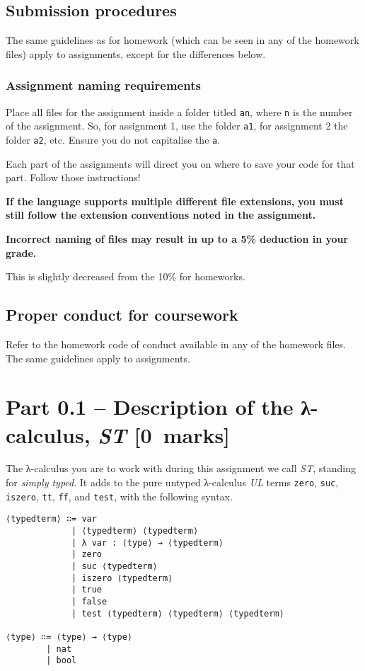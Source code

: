 \documentclass[11pt]{article}
\theoremstyle{definition}
\begin{document}
\subsection*{Submission procedures}
\label{sec:orgdbb70ad}
The same guidelines as for homework
(which can be seen in any of the homework files)
apply to assignments, except for the differences below.

\subsubsection*{Assignment naming requirements}
\label{sec:org925f989}

Place all files for the assignment
inside a folder titled \texttt{an}, where \texttt{n} is the number of the assignment.
So, for assignment 1, use the folder \texttt{a1}, for assignment 2 the folder \texttt{a2}, etc.
Ensure you do not capitalise the \texttt{a}.

Each part of the assignments will direct you on where to
save your code for that part. Follow those instructions!

\begin{center}
\textbf{If the language supports multiple different file extensions,}
\textbf{you must still follow the extension conventions noted in the assignment.}
\end{center}

\begin{center}
\textbf{Incorrect naming of files may result in up to a 5\% deduction in your grade.}
\end{center}
This is slightly decreased from the 10\% for homeworks.

\subsection*{Proper conduct for coursework}
\label{sec:org7b71594}
Refer to the homework code of conduct available in any of the homework files.
The same guidelines apply to assignments.

\section*{Part 0.1 – Description of the λ-calculus, \emph{ST}                 [0 marks]}
\label{sec:org0abf3e5}
The λ-calculus you are to work with during this assignment
we call \emph{ST}, standing for \emph{simply typed}.
It adds to the pure untyped λ-calculus \emph{UL}
terms \texttt{zero}, \texttt{suc}, \texttt{iszero}, \texttt{tt}, \texttt{ff}, and \texttt{test}, with the following syntax.
\begin{verbatim}
⟨typedterm⟩ ∷= var
             | ⟨typedterm⟩ ⟨typedterm⟩
             | λ var : ⟨type⟩ → ⟨typedterm⟩
             | zero
             | suc ⟨typedterm⟩
             | iszero ⟨typedterm⟩
             | true
             | false
             | test ⟨typedterm⟩ ⟨typedterm⟩ ⟨typedterm⟩

⟨type⟩ ∷= ⟨type⟩ → ⟨type⟩
        | nat
        | bool
\end{verbatim}
\end{document}
